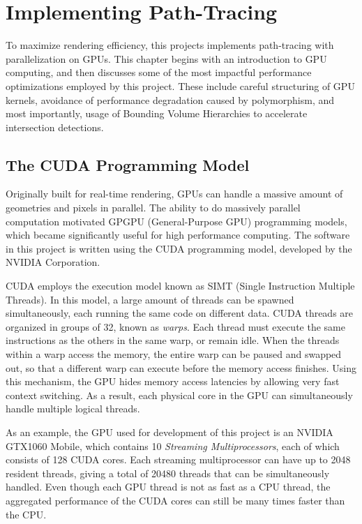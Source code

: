\chapter{Implementing Path-Tracing}
\label{chapter implementation}

To maximize rendering efficiency, this projects implements path-tracing with parallelization on GPUs. This chapter begins with an introduction to GPU computing, and then discusses some of the most impactful performance optimizations employed by this project. These include careful structuring of GPU kernels, avoidance of performance degradation caused by polymorphism, and most importantly, usage of Bounding Volume Hierarchies to accelerate intersection detections.

\section{The CUDA Programming Model}

Originally built for real-time rendering, GPUs can handle a massive amount of geometries and pixels in parallel. The ability to do massively parallel computation motivated GPGPU (General-Purpose GPU) programming models, which became significantly useful for high performance computing. The software in this project is written using the CUDA programming model, developed by the NVIDIA Corporation.

CUDA employs the execution model known as SIMT (Single Instruction Multiple Threads). In this model, a large amount of threads can be spawned simultaneously, each running the same code on different data. CUDA threads are organized in groups of 32, known as \textit{warps}. Each thread must execute the same instructions as the others in the same warp, or remain idle. When the threads within a warp access the memory, the entire warp can be paused and swapped out, so that a different warp can execute before the memory access finishes. Using this mechanism, the GPU hides memory access latencies by allowing very fast context switching. As a result, each physical core in the GPU can simultaneously handle multiple logical threads.

As an example, the GPU used for development of this project is an NVIDIA GTX1060 Mobile, which contains 10 \textit{Streaming Multiprocessors}, each of which consists of 128 CUDA cores. Each streaming multiprocessor can have up to 2048 resident threads, giving a total of 20480 threads that can be simultaneously handled. Even though each GPU thread is not as fast as a CPU thread, the aggregated performance of the CUDA cores can still be many times faster than the CPU.

